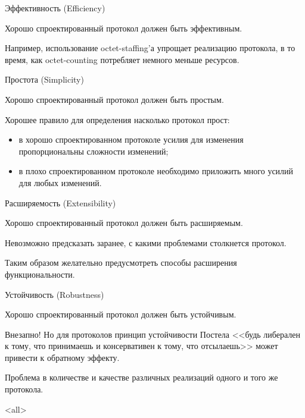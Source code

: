 \begin{frame}{Эффективность (Efficiency)}

	Хорошо спроектированный протокол должен быть эффективным.\\
	\bigskip

	Например,  использование octet-staffing'а упрощает реализацию протокола,  в то время,  как octet-counting потребляет немного меньше ресурсов.
\end{frame}


\begin{frame}{Простота (Simplicity)}

	Хорошо спроектированный протокол должен быть простым.\\
	\bigskip

	Хорошее правило для определения насколько протокол прост:
	\begin{itemize}
		\item в хорошо спроектированном протоколе усилия для изменения пропорциональны сложности изменений;
		\item в плохо спроектированном протоколе необходимо приложить много усилий для любых изменений.
	\end{itemize}
\end{frame}

\begin{frame}{Расширяемость (Extensibility)}

	Хорошо спроектированный протокол должен быть расширяемым.\\
	\bigskip

	Невозможно предсказать заранее,  с какими проблемами столкнется протокол.

	Таким образом желательно предусмотреть способы расширения функциональности.
\end{frame}

\begin{frame}{Устойчивость (Robustness)}

Хорошо спроектированный протокол должен быть устойчивым.\\
	\bigskip

Внезапно! Но для протоколов принцип устойчивости Постела <<будь либерален к тому,  что принимаешь и консервативен к тому,  что отсылаешь>> может привести к обратному эффекту.\\
	\bigskip

Проблема в количестве и качестве различных реализаций одного и того же протокола.
\end{frame}

\mode<all>{}


